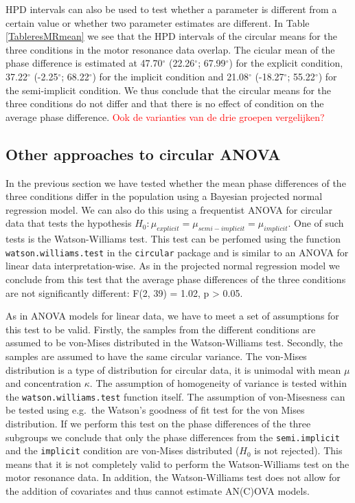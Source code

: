\documentclass[11pt,]{article}
\begin{document}
HPD intervals can also be used to test whether a parameter is different
from a certain value or whether two parameter estimates are different.
In Table \ref{TableresMRmean} we see that the HPD intervals of the
circular means for the three conditions in the motor resonance data
overlap. The cicular mean of the phase difference is estimated at
47.70\(^\circ\) (22.26\(^\circ\); 67.99\(^\circ\)) for the explicit
condition, 37.22\(^\circ\) (-2.25\(^\circ\); 68.22\(^\circ\)) for the
implicit condition and 21.08\(^\circ\) (-18.27\(^\circ\);
55.22\(^\circ\)) for the semi-implicit condition. We thus conclude that
the circular means for the three conditions do not differ and that there
is no effect of condition on the average phase difference.
\textcolor{red}{Ook de varianties van de drie groepen
vergelijken?}

\subsection{Other approaches to circular ANOVA}\label{otheranova}

In the previous section we have tested whether the mean phase
differences of the three conditions differ in the population using a
Bayesian projected normal regression model. We can also do this using a
frequentist ANOVA for circular data that tests the hypothesis
\(H_0: \mu_{explicit} = \mu_{semi-implicit} = \mu_{implicit}\). One of
such tests is the Watson-Williams test. This test can be perfomed using
the function \verb|watson.williams.test| in the \verb|circular| package
and is similar to an ANOVA for linear data interpretation-wise. As in
the projected normal regression model we conclude from this test that
the average phase differences of the three conditions are not
significantly different: F(2, 39) = 1.02, p \textgreater{} 0.05.

As in ANOVA models for linear data, we have to meet a set of assumptions
for this test to be valid. Firstly, the samples from the different
conditions are assumed to be von-Mises distributed in the
Watson-Williams test. Secondly, the samples are assumed to have the same
circular variance. The von-Mises distribution is a type of distribution
for circular data, it is unimodal with mean \(\mu\) and concentration
\(\kappa\). The assumption of homogeneity of variance is tested within
the \verb|watson.williams.test| function itself. The assumption of
von-Misesness can be tested using e.g.~the Watson's goodness of fit test
for the von Mises distribution. If we perform this test on the phase
differences of the three subgroups we conclude that only the phase
differences from the \verb|semi.implicit| and the \verb|implicit|
condition are von-Mises distributed (\(H_0\) is not rejected). This
means that it is not completely valid to perform the Watson-Williams
test on the motor resonance data. In addition, the Watson-Williams test
does not allow for the addition of covariates and thus cannot estimate
AN(C)OVA models.
\end{document}
